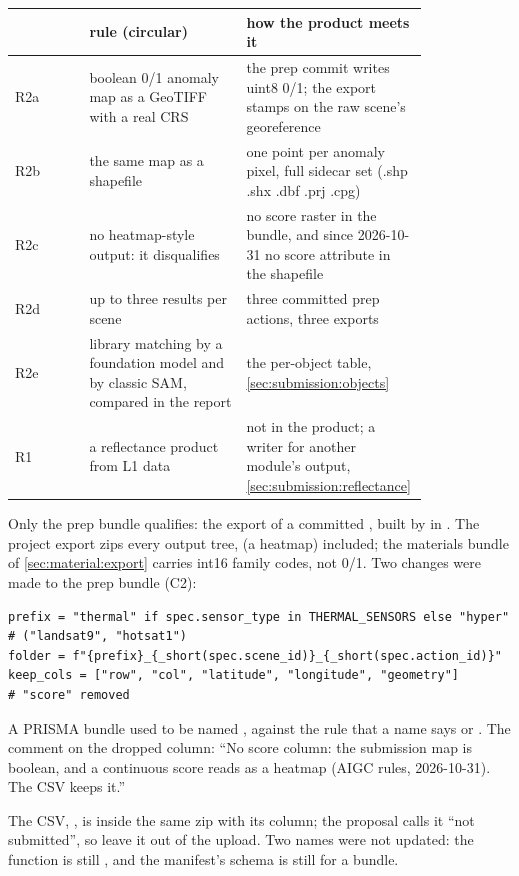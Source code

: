 \begin{center}\small
\begin{tabular}{@{}lp{0.38\linewidth}p{0.44\linewidth}@{}}
\toprule
& rule (circular) & how the product meets it\\
\midrule
R2a & boolean 0/1 anomaly map as a GeoTIFF with a real CRS & the prep commit writes uint8 0/1; the export stamps on
the raw scene's georeference\\
R2b & the same map as a shapefile & one point per anomaly pixel, full sidecar set (.shp .shx .dbf .prj .cpg)\\
R2c & no heatmap-style output: it disqualifies & no score raster in the bundle, and since 2026-10-31 no score
attribute in the shapefile\\
R2d & up to three results per scene & three committed prep actions, three exports\\
R2e & library matching by a foundation model and by classic SAM, compared in the report & the per-object table,
\cref{sec:submission:objects}\\
R1 & a reflectance product from L1 data & not in the product; a writer for another module's output,
\cref{sec:submission:reflectance}\\
\bottomrule
\end{tabular}
\end{center}

Only the prep bundle qualifies: the export of a committed , built by
 in . The project export zips every output tree,
 (a heatmap) included; the materials bundle of \cref{sec:material:export} carries int16 family
codes, not 0/1. Two changes were made to the prep bundle (C2):
\begin{lstlisting}
prefix = "thermal" if spec.sensor_type in THERMAL_SENSORS else "hyper"   # ("landsat9", "hotsat1")
folder = f"{prefix}_{_short(spec.scene_id)}_{_short(spec.action_id)}"
keep_cols = ["row", "col", "latitude", "longitude", "geometry"]           # "score" removed
\end{lstlisting}
A PRISMA bundle used to be named , against the rule that a name says  or .
The comment on the dropped column: ``No score column: the submission map is boolean, and a continuous score reads as a
heatmap (AIGC rules, 2026-10-31). The CSV keeps it.''

\begin{sourcenote}
The CSV, , is inside the same zip with its  column; the proposal calls it
``not submitted'', so leave it out of the upload. Two names were not updated: the function is still
, and the manifest's schema is still  for a 
bundle.
\end{sourcenote}

